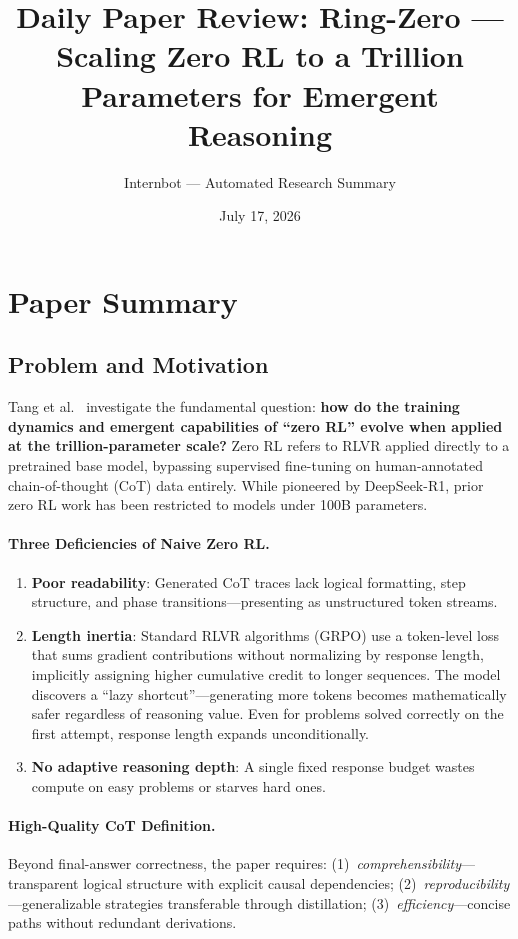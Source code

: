 \documentclass[11pt,a4paper]{article}
\title{Daily Paper Review: Ring-Zero --- Scaling Zero RL to a Trillion\\Parameters for Emergent Reasoning}
\author{Internbot --- Automated Research Summary}
\date{July 17, 2026}
\begin{document}
\maketitle

\section{Paper Summary}

\subsection{Problem and Motivation}

Tang et al.~\cite{tang2026ringzero} investigate the fundamental question: \textbf{how do the training dynamics and emergent capabilities of ``zero RL'' evolve when applied at the trillion-parameter scale?} Zero RL refers to RLVR applied directly to a pretrained base model, bypassing supervised fine-tuning on human-annotated chain-of-thought (CoT) data entirely. While pioneered by DeepSeek-R1, prior zero RL work has been restricted to models under 100B parameters.

\paragraph{Three Deficiencies of Naive Zero RL.}
\begin{enumerate}
\item \textbf{Poor readability}: Generated CoT traces lack logical formatting, step structure, and phase transitions---presenting as unstructured token streams.
\item \textbf{Length inertia}: Standard RLVR algorithms (GRPO) use a token-level loss that sums gradient contributions without normalizing by response length, implicitly assigning higher cumulative credit to longer sequences. The model discovers a ``lazy shortcut''---generating more tokens becomes mathematically safer regardless of reasoning value. Even for problems solved correctly on the first attempt, response length expands unconditionally.
\item \textbf{No adaptive reasoning depth}: A single fixed response budget wastes compute on easy problems or starves hard ones.
\end{enumerate}

\paragraph{High-Quality CoT Definition.} Beyond final-answer correctness, the paper requires: (1)~\emph{comprehensibility}---transparent logical structure with explicit causal dependencies; (2)~\emph{reproducibility}---generalizable strategies transferable through distillation; (3)~\emph{efficiency}---concise paths without redundant derivations.
\end{document}
